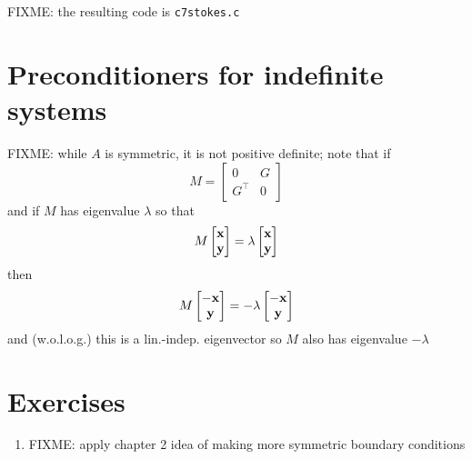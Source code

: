 FIXME: the resulting code is \texttt{c7stokes.c}


\section{Preconditioners for indefinite systems}

FIXME: while $A$ is symmetric, it is not positive definite; note that if
    $$M = \begin{bmatrix} 0 & G \\ G^\top & 0 \end{bmatrix}$$
and if $M$ has eigenvalue $\lambda$ so that
    $$M \begin{bmatrix} \mathbf{x} \\ \mathbf{y} \end{bmatrix} = \lambda \begin{bmatrix} \mathbf{x} \\ \mathbf{y} \end{bmatrix}$$
then
    $$M \begin{bmatrix} -\mathbf{x} \\ \mathbf{y} \end{bmatrix} = - \lambda \begin{bmatrix} -\mathbf{x} \\ \mathbf{y} \end{bmatrix}$$
and (w.o.l.o.g.) this is a lin.-indep. eigenvector so $M$ also has eigenvalue $-\lambda$



\section{Exercises}

\renewcommand{\labelenumi}{\arabic{chapter}.\arabic{enumi}\quad}
\begin{enumerate}
\item FIXME: apply chapter 2 idea of making more symmetric boundary conditions
\end{enumerate}
